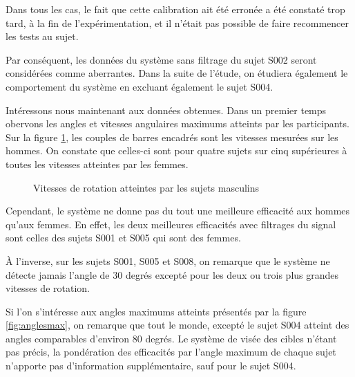 \documentclass[letterpaper, twoside, 12pt, memoire, creativecommons, hyperref]{thETS}
\begin{document}
Dans tous les cas, le fait que cette calibration ait été erronée a été constaté trop tard, à la fin de l'expérimentation, et il n'était pas possible de faire recommencer les tests au sujet.

Par conséquent, les données du système sans filtrage du sujet S002 seront considérées comme aberrantes. Dans la suite de l'étude, on étudiera également le comportement du système en excluant également le sujet S004.

Intéressons nous maintenant aux données obtenues. Dans un premier temps obervons les angles et vitesses angulaires maximums atteints par les participants. Sur la figure \ref{fig:vitesseshommes}, les couples de barres encadrés sont les vitesses mesurées sur les hommes. On constate que celles-ci sont pour quatre sujets sur cinq supérieures à toutes les vitesses atteintes par les femmes. 

\begin{figure}
	\centering
	\caption{Vitesses de rotation atteintes par les sujets masculins}
	\label{fig:vitesseshommes}
\end{figure}

Cependant, le système ne donne pas du tout une meilleure efficacité aux hommes qu'aux femmes. En effet, les deux meilleures efficacités avec filtrages du signal sont celles des sujets S001 et S005 qui sont des femmes. 

À l'inverse, sur les sujets S001, S005 et S008, on remarque que le système ne détecte jamais l'angle de 30 degrés excepté pour les deux ou trois plus grandes vitesses de rotation.  

Si l'on s'intéresse aux angles maximums atteints présentés par la figure \ref{fig:anglesmax}, on remarque que tout le monde, excepté le sujet S004 atteint des angles comparables d'environ 80 degrés. Le système de visée des cibles n'étant pas précis, la pondération des efficacités par l'angle maximum de chaque sujet n'apporte pas d'information supplémentaire, sauf pour le sujet S004. 
\end{document}
